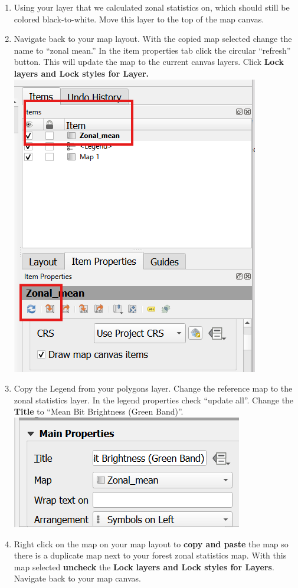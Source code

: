 \documentclass[
  letterpaper,
]{book}
\providecommand{\tightlist}{%
  \setlength{\itemsep}{0pt}\setlength{\parskip}{0pt}}\usepackage{longtable,booktabs,array}
\begin{document}
\begin{enumerate}
\def\labelenumi{\Alph{enumi}.}
\tightlist
\item
  Using your layer that we calculated zonal statistics on, which should
  still be colored black-to-white. Move this layer to the top of the map
  canvas.
\item
  Navigate back to your map layout. With the copied map selected change
  the name to ``zonal mean.'' In the item properties tab click the
  circular ``refresh'' button. This will update the map to the current
  canvas layers. Click \textbf{Lock layers and Lock styles for Layer.}\\
  \includegraphics{images/clipboard-1003007197.png}
\item
  Copy the Legend from your polygons layer. Change the reference map to
  the zonal statistics layer. In the legend properties check ``update
  all''. Change the \textbf{Title} to ``Mean Bit Brightness (Green
  Band)''.\\
  \includegraphics{images/clipboard-798660786.png}
\item
  Right click on the map on your map layout to \textbf{copy and paste}
  the map so there is a duplicate map next to your forest zonal
  statistics map. With this map selected \textbf{uncheck} the
  \textbf{Lock layers and Lock styles for Layers}. Navigate back to your
  map canvas.
\end{enumerate}
\end{document}
